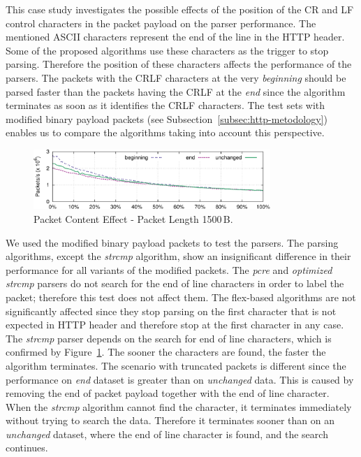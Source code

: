This case study investigates the possible effects of the position of the CR and LF control characters in the packet payload on the parser performance. The mentioned ASCII characters represent the end of the line in the HTTP header. Some of the proposed algorithms use these characters as the trigger to stop parsing. Therefore the position of these characters affects the performance of the parsers. The packets with the CRLF characters at the very \emph{beginning} should be parsed faster than the packets having the CRLF at the \emph{end} since the algorithm terminates as soon as it identifies the CRLF characters. The test sets with modified binary payload packets (see Subsection~\ref{subsec:http-metodology}) enables us to compare the algorithms taking into account this perspective.

\begin{figure}[t]
    \centering
    \includegraphics[width=0.8\textwidth]{figures/paper-http/1500_noflex}
    \caption{Packet Content Effect - Packet Length 1500\,B.}
    \label{fig:http-packet_structure}
\end{figure}

We used the modified binary payload packets to test the parsers. The parsing algorithms, except the \emph{strcmp} algorithm, show an insignificant difference in their performance for all variants of the modified packets. The \emph{pcre} and \emph{optimized strcmp} parsers do not search for the end of line characters in order to label the packet; therefore this test does not affect them. The flex-based algorithms are not significantly affected since they stop parsing on the first character that is not expected in HTTP header and therefore stop at the first character in any case. The \emph{strcmp} parser depends on the search for end of line characters, which is confirmed by Figure~\ref{fig:http-packet_structure}. The sooner the characters are found, the faster the algorithm terminates. The scenario with truncated packets is different since the performance on \emph{end} dataset is greater than on \emph{unchanged} data. This is caused by removing the end of packet payload together with the end of line character. When the \emph{strcmp} algorithm cannot find the character, it terminates immediately without trying to search the data. Therefore it terminates sooner than on an \emph{unchanged} dataset, where the end of line character is found, and the search continues.

